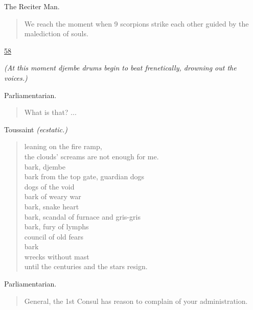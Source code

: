 \documentclass[letterpaper,article,12pt,oneside,notitlepage]{memoir}
\begin{document}
\begin{center}The Reciter Man.\end{center}

\begin{verse}
We reach the moment when 9 scorpions strike each other guided by the malediction of souls. \\
\end{verse}

\clearpage

\href{http://cesaire.elotroalex.com/chiens/chiens/p058.html}{58}

\textit{(At this moment djembe drums begin to beat frenetically, drowning out the voices.)}

\begin{center}Parliamentarian.\end{center}

\begin{verse}
\hspace{1cm} What is that? ... \\
\end{verse}

\begin{center}Toussaint \textit{(ecstatic.)}\end{center}

\begin{verse}
leaning on the fire ramp, \\
the clouds' screams are not enough for me. \\
bark, djembe \\
bark from the top gate, guardian dogs \\
dogs of the void \\
bark of weary war \\
bark, snake heart \\
bark, scandal of furnace and gris-gris \\
bark, fury of lymphs \\
council of old fears \\
bark \\
wrecks without mast \\
until the centuries and the stars resign. \\
\end{verse}

\begin{center}Parliamentarian.\end{center}

\begin{verse}
\hspace{1cm} General, the 1st Consul has reason to complain of your administration. \\
\end{verse}
\end{document}
